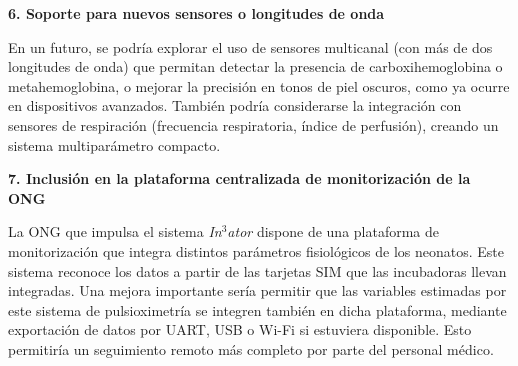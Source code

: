 \textbf{6. Soporte para nuevos sensores o longitudes de onda}

En un futuro, se podría explorar el uso de sensores multicanal (con más de dos longitudes de onda) que permitan detectar la presencia de carboxihemoglobina o metahemoglobina, o mejorar la precisión en tonos de piel oscuros, como ya ocurre en dispositivos avanzados. También podría considerarse la integración con sensores de respiración (frecuencia respiratoria, índice de perfusión), creando un sistema multiparámetro compacto.

\textbf{7. Inclusión en la plataforma centralizada de monitorización de la ONG}

La ONG que impulsa el sistema \textit{In$^3$ator} dispone de una plataforma de monitorización que integra distintos parámetros fisiológicos de los neonatos. Este sistema reconoce los datos a partir de las tarjetas SIM que las incubadoras llevan integradas. Una mejora importante sería permitir que las variables estimadas por este sistema de pulsioximetría se integren también en dicha plataforma, mediante exportación de datos por UART, USB o Wi-Fi si estuviera disponible. Esto permitiría un seguimiento remoto más completo por parte del personal médico.